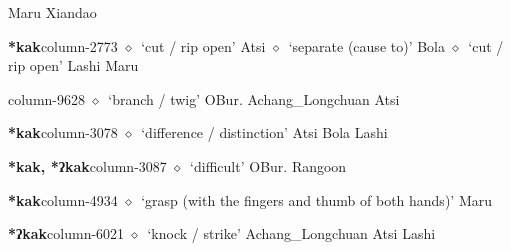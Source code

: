 \hspace{1ex}
         Maru 
\hspace{1ex}
         Xiandao 
  \item {\footnotesize \textbf{*kak}}{\tiny column-2773}
         $\diamond$~`cut / rip open'
         Atsi 
\hspace{1ex}
         $\diamond$~`separate (cause to)'
         Bola 
\hspace{1ex}
         $\diamond$~`cut / rip open'
         Lashi 
\hspace{1ex}
         Maru 
  \item {\footnotesize \textbf{}}{\tiny column-9628}
         $\diamond$~`branch / twig'
         OBur. 
\hspace{1ex}
         Achang\_Longchuan 
\hspace{1ex}
         Atsi 
  \item {\footnotesize \textbf{*kak}}{\tiny column-3078}
         $\diamond$~`difference / distinction'
         Atsi 
\hspace{1ex}
         Bola 
\hspace{1ex}
         Lashi 
  \item {\footnotesize \textbf{*kak, *ʔkak}}{\tiny column-3087}
         $\diamond$~`difficult'
         OBur. 
\hspace{1ex}
         Rangoon 
  \item {\footnotesize \textbf{*kak}}{\tiny column-4934}
         $\diamond$~`grasp (with the fingers and thumb of both hands)'
         Maru 
  \item {\footnotesize \textbf{*ʔkak}}{\tiny column-6021}
         $\diamond$~`knock / strike'
         Achang\_Longchuan 
\hspace{1ex}
         Atsi 
\hspace{1ex}
         Lashi 
